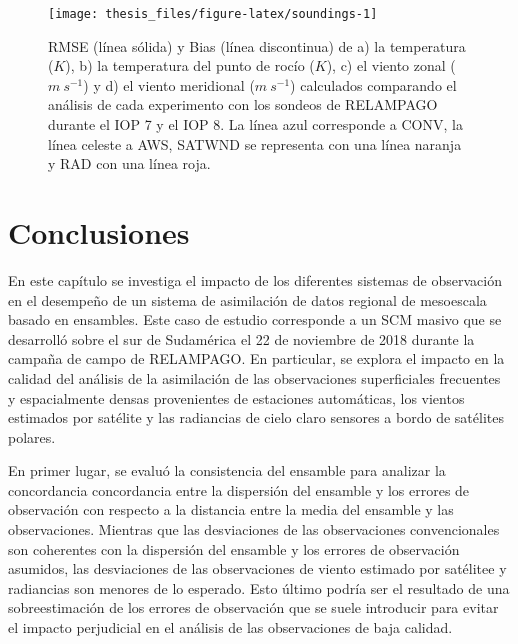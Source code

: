 \documentclass[12pt,oneside,a4paper]{reedthesis}
\begin{document}
\begin{figure}

{\centering \texttt{[image: thesis\_files/figure-latex/soundings-1]} 

}

\caption{RMSE (línea sólida) y Bias (línea discontinua) de a) la temperatura (\(K\)), b) la temperatura del punto de rocío (\(K\)), c) el viento zonal (\(m\ s^{-1}\)) y d) el viento meridional (\(m\ s^{-1}\)) calculados comparando el análisis de cada experimento con los sondeos de RELAMPAGO durante el IOP 7 y el IOP 8. La línea azul corresponde a CONV, la línea celeste a AWS, SATWND se representa con una línea naranja y RAD con una línea roja.}\label{fig:soundings}
\end{figure}
\hypertarget{conclusiones}{%
\section{Conclusiones}\label{conclusiones}}

En este capítulo se investiga el impacto de los diferentes sistemas de observación en el desempeño de un sistema de asimilación de datos regional de mesoescala basado en ensambles. Este caso de estudio corresponde a un SCM masivo que se desarrolló sobre el sur de Sudamérica el 22 de noviembre de 2018 durante la campaña de campo de RELAMPAGO. En particular, se explora el impacto en la calidad del análisis de la asimilación de las observaciones superficiales frecuentes y espacialmente densas provenientes de estaciones automáticas, los vientos estimados por satélite y las radiancias de cielo claro sensores a bordo de satélites polares.

En primer lugar, se evaluó la consistencia del ensamble para analizar la concordancia concordancia entre la dispersión del ensamble y los errores de observación con respecto a la distancia entre la media del ensamble y las observaciones. Mientras que las desviaciones de las observaciones convencionales son coherentes con la dispersión del ensamble y los errores de observación asumidos, las desviaciones de las observaciones de viento estimado por satélitee y radiancias son menores de lo esperado. Esto último podría ser el resultado de una sobreestimación de los errores de observación que se suele introducir para evitar el impacto perjudicial en el análisis de las observaciones de baja calidad.
\end{document}
